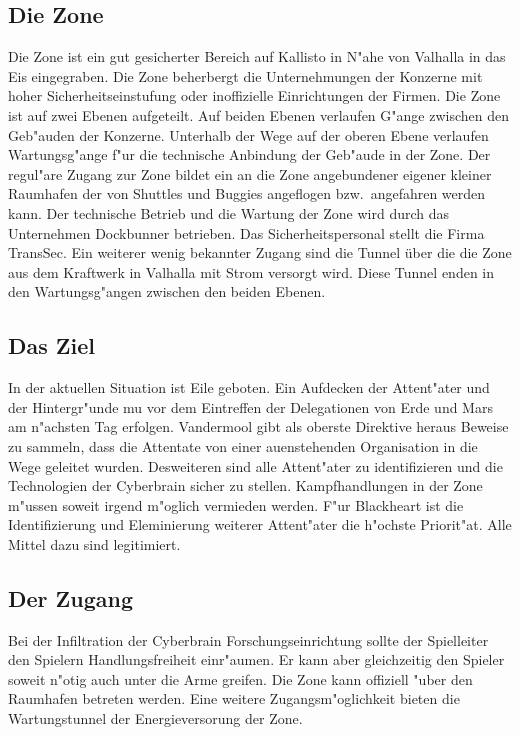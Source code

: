 \subsection{Die Zone}
Die Zone ist ein gut gesicherter Bereich auf Kallisto in N"ahe von Valhalla in das Eis eingegraben. Die Zone beherbergt die Unternehmungen der Konzerne mit hoher Sicherheitseinstufung oder inoffizielle Einrichtungen der Firmen. Die Zone ist auf zwei Ebenen aufgeteilt. Auf beiden Ebenen verlaufen G"ange zwischen den Geb"auden der Konzerne. Unterhalb der Wege auf der oberen Ebene verlaufen Wartungsg"ange f"ur die technische Anbindung der Geb"aude in der Zone. Der regul"are Zugang zur Zone bildet ein an die Zone angebundener eigener kleiner Raumhafen der von Shuttles und Buggies angeflogen bzw.~angefahren werden kann. Der technische Betrieb und die Wartung der Zone wird durch das Unternehmen Dockbunner betrieben. Das Sicherheitspersonal stellt die Firma TransSec. Ein weiterer wenig bekannter Zugang sind die Tunnel über die die Zone aus dem Kraftwerk in Valhalla mit Strom versorgt wird. Diese Tunnel enden in den Wartungsg"angen zwischen den beiden Ebenen.

\subsection{Das Ziel} 
In der aktuellen Situation ist Eile geboten. Ein Aufdecken der Attent"ater und der Hintergr"unde mu\3 vor dem Eintreffen der Delegationen von Erde und Mars am n"achsten Tag erfolgen. Vandermool gibt als oberste Direktive heraus Beweise zu sammeln, dass die Attentate von einer au\3enstehenden Organisation in die Wege geleitet wurden. Desweiteren sind alle Attent"ater zu identifizieren und die Technologien der Cyberbrain sicher zu stellen. Kampfhandlungen in der Zone m"ussen soweit irgend m"oglich vermieden werden. F"ur Blackheart ist die Identifizierung und Eleminierung weiterer Attent"ater die h"ochste Priorit"at. Alle Mittel dazu sind legitimiert. 

\subsection{Der Zugang} 
Bei der Infiltration der Cyberbrain Forschungseinrichtung sollte der Spielleiter den Spielern Handlungsfreiheit einr"aumen. Er kann aber gleichzeitig den Spieler soweit n"otig auch unter die Arme greifen. Die Zone kann offiziell "uber den Raumhafen betreten werden. Eine weitere Zugangsm"oglichkeit bieten die Wartungstunnel der Energieversorung der Zone.


